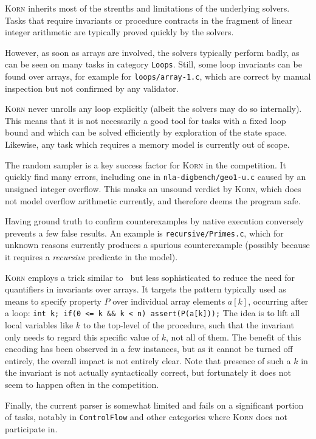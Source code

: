 \documentclass{llncs}
\newcommand{\Korn}{\textsc{Korn}\xspace}
\begin{document}
\Korn inherits most of the strenths and limitations of the underlying solvers.
Tasks that require invariants or procedure contracts in the fragment of linear integer arithmetic
are typically proved quickly by the solvers.

However, as soon as arrays are involved, the solvers typically perform badly,
as can be seen on many tasks in category \texttt{Loops}.
Still, some loop invariants can be found over arrays, for example for \texttt{loops/array-1.c},
which are correct by manual inspection but not confirmed by any validator.

\Korn never unrolls any loop explicitly (albeit the solvers may do so internally).
This means that it is not necessarily a good tool for 
tasks with a fixed loop bound and which can be solved efficiently by exploration of the state space.
Likewise, any task which requires a memory model is currently out of scope.

The random sampler is a key success factor for \Korn in the competition.
It quickly find many errors, including one in \texttt{nla-digbench/geo1-u.c} caused by an unsigned integer overflow.
This masks an unsound verdict by \Korn, which does not model overflow arithmetic currently, and therefore deems the program safe.

Having ground truth to confirm counterexamples by native execution conversely prevents a few false results.
An example is \texttt{recursive/Primes.c}, which for unknown reasons
currently produces a spurious counterexample (possibly because it requires a \emph{recursive} predicate in the model).

\Korn employs a trick similar to~\cite{monniaux2016cell} but less sophisticated
to reduce the need for quantifiers in invariants over arrays.
It targets the pattern typically used as means to specify property $P$ over individual array elements $a[k]$,
occurring after a loop:
\verb|int k; if(0 <= k && k < n) assert(P(a[k]));|
The idea is to lift all local variables like $k$ to the top-level of the procedure,
such that the invariant only needs to regard this specific value of $k$, not all of them.
The benefit of this encoding has been observed in a few instances,
but as it cannot be turned off entirely, the overall impact is not entirely clear.
Note that presence of such a $k$ in the invariant is not actually syntactically correct,
but fortunately it does not seem to happen often in the competition.

Finally, the current parser is somewhat limited and fails on a significant portion of tasks,
notably in \texttt{ControlFlow} and other categories where \Korn does not participate in.
\end{document}
